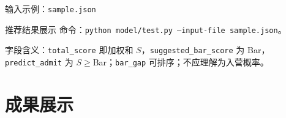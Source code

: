 \documentclass[10pt, aspectratio=169]{beamer}
\begin{document}
\begin{frame}[fragile]{输入示例：\texttt{sample.json}}
    
\end{frame}

\begin{frame}{推荐结果展示}
    \small
    命令：\texttt{python model/test.py --input-file sample.json}。
    \vspace{0.2cm}
    
    \vspace{0.15cm}
    \centering \footnotesize 字段含义：\texttt{total\_score} 即加权和 $S$，\texttt{suggested\_bar\_score} 为 Bar，\texttt{predict\_admit} 为 $S\!\ge\!$Bar；\texttt{bar\_gap} 可排序；不应理解为入营概率。
\end{frame}

\section{成果展示}
\end{document}
